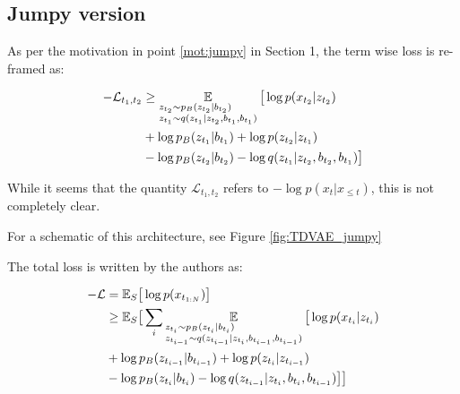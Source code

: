 \documentclass[10pt,twocolumn,letterpaper]{article}
\begin{document}
	
	\subsection{Jumpy version}
	As per the motivation in point \ref{mot:jumpy} in Section 1, the term wise loss is re-framed as:
	
	\begin{equation}\label{eq:jumpy_elbo}
		\begin{split}
		-\mathcal{L}_{t_1, t_2} &\geq \E_{\begin{subarray}
			\centering
			z_{t_2} \sim p_B(z_{t_2}| b_{t_2}) \\
			z_{t_1} \sim q(z_{t_1}| z_{t_2}, b_{t_1}, b_{t_1})
			\end{subarray}} \big[\log p(x_{t_2}|z_{t_2}) 
		\\&+ \log p_B(z_{t_1}| b_{t_1})
+ \log p(z_{t_2}| z_{t_1}) \\&- \log p_B(z_{t_2}| b_{t_2}) - \log q(z_{t_1}| z_{t_2}, b_{t_2}, b_{t_1})\big]
		\end{split}
	\end{equation}
	
	While it seems that the quantity $\mathcal{L}_{t_1, t_2}$ refers to $-\log p(x_t|x_{\leq t})$, this is not completely clear. \vspace{4mm}
	\par For a schematic of this architecture, see Figure \ref{fig:TDVAE_jumpy} 
	
	The total loss is written by the authors as:
	
	\begin{equation}\label{eq:total_jumpy_elbo}
	\begin{split}
	-\mathcal{L} &= \mathbb{E}_S \big[\log p(x_{t_{1:N}})\big]\\
	&\geq \mathbb{E}_S \big[\sum_{i} \E_{\begin{subarray}
		\centering
		z_{t_i} \sim p_B(z_{t_i}| b_{t_i}) \\
		z_{t_{i-1}} \sim q(z_{t_{i-1}}| z_{t_i}, b_{t_{i-1}}, b_{t_{i-1}})
		\end{subarray}} \big[\log p(x_{t_i}|z_{t_i}) 
	\\&+ \log p_B(z_{t_{i-1}}| b_{t_{i-1}})
+ \log p(z_{t_i}| z_{t_{i-1}}) \\&- \log p_B(z_{t_i}| b_{t_i}) - \log q(z_{t_{i-1}}| z_{t_i}, b_{t_i}, b_{t_{i-1}})\big]\big]
	\end{split}
	\end{equation}
	
\end{document}
